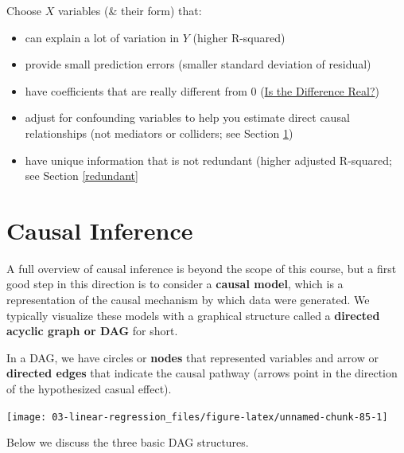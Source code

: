 \documentclass[
]{book}
\providecommand{\tightlist}{%
  \setlength{\itemsep}{0pt}\setlength{\parskip}{0pt}}
\begin{document}
Choose \(X\) variables (\& their form) that:

\begin{itemize}
\tightlist
\item
  can explain a lot of variation in \(Y\) (higher R-squared)
\item
  provide small prediction errors (smaller standard deviation of residual)
\item
  have coefficients that are really different from 0 (\hyperref[is-the-difference-real]{Is the Difference Real?})
\item
  adjust for confounding variables to help you estimate direct causal relationships (not mediators or colliders; see Section \ref{dag})
\item
  have unique information that is not redundant (higher adjusted R-squared; see Section \ref{redundant}
\end{itemize}

\section{Causal Inference}\label{dag}

A full overview of causal inference is beyond the scope of this course, but a first good step in this direction is to consider a \textbf{causal model}, which is a representation of the causal mechanism by which data were generated. We typically visualize these models with a graphical structure called a \textbf{directed acyclic graph or DAG} for short.

In a DAG, we have circles or \textbf{nodes} that represented variables and arrow or \textbf{directed edges} that indicate the causal pathway (arrows point in the direction of the hypothesized casual effect).

\begin{center}\texttt{[image: 03-linear-regression\_files/figure-latex/unnamed-chunk-85-1]} \end{center}

Below we discuss the three basic DAG structures.
\end{document}

